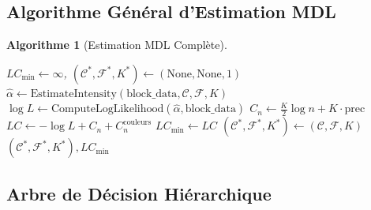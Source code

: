 \documentclass[12pt,a4paper]{article}
\newtheorem{algo}{Algorithme}[section]
\begin{document}
	\subsection{Algorithme Général d'Estimation MDL}
	\label{subsec:algorithme_general}
	
	\begin{algo}[Estimation MDL Complète]
		\label{algo:estimation_mdl_complete}
		\begin{algorithmic}[1]
			\State $LC_{\text{min}} \gets \infty$, $(\mathcal{C}^*, \mathcal{F}^*, K^*) \gets (\text{None}, \text{None}, 1)$
			\State $\hat{\alpha} \gets \text{EstimateIntensity}(\text{block\_data}, \mathcal{C}, \mathcal{F}, K)$
			\State $\log L \gets \text{ComputeLogLikelihood}(\hat{\alpha}, \text{block\_data})$
			\State $C_n \gets \frac{K}{2} \log n + K \cdot \text{prec}$
			\State $LC \gets -\log L + C_n + C_n^{\text{couleurs}}$
			\State $LC_{\text{min}} \gets LC$
			\State $(\mathcal{C}^*, \mathcal{F}^*, K^*) \gets (\mathcal{C}, \mathcal{F}, K)$
			\EndIf
			\EndFor
			\EndFor
			\EndFor
			\State \Return $(\mathcal{C}^*, \mathcal{F}^*, K^*), LC_{\text{min}}$
			\EndProcedure
		\end{algorithmic}
	\end{algo}
	
	\subsection{Arbre de Décision Hiérarchique}
	\label{subsec:arbre_decision}
	
\end{document}
